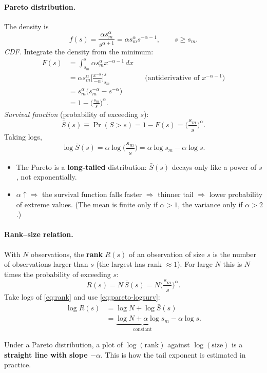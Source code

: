 \paragraph{Pareto distribution.} The density is
\begin{equation}\label{eq:pareto-pdf}
  f(s)=\frac{\alpha s_m^\alpha}{s^{\alpha+1}}=\alpha s_m^\alpha s^{-\alpha-1},\qquad s\ge s_m.
\end{equation}
\emph{CDF.} Integrate the density from the minimum:
\begin{align*}
  F(s)&=\int_{s_m}^{s}\alpha s_m^\alpha x^{-\alpha-1}\,dx\\
  &=\alpha s_m^\alpha\Big[\frac{x^{-\alpha}}{-\alpha}\Big]_{s_m}^{s} &&\text{(antiderivative of }x^{-\alpha-1}\text{)}\\
  &=s_m^\alpha\big(s_m^{-\alpha}-s^{-\alpha}\big)\\
  &=1-\Big(\frac{s_m}{s}\Big)^\alpha.
\end{align*}
\emph{Survival function} (probability of exceeding $s$):
\begin{equation}\label{eq:pareto-surv}
  \bar S(s)\equiv\Pr(S>s)=1-F(s)=\Big(\frac{s_m}{s}\Big)^\alpha .
\end{equation}
Taking logs,
\begin{equation}\label{eq:pareto-logsurv}
  \log\bar S(s)=\alpha\log\Big(\frac{s_m}{s}\Big)=\alpha\log s_m-\alpha\log s .
\end{equation}
\begin{itemize}
  \item The Pareto is a \textbf{long-tailed} distribution: $\bar S(s)$ decays only like a power of $s$, not exponentially.
  \item $\alpha\uparrow\Rightarrow$ the survival function falls faster $\Rightarrow$ thinner tail $\Rightarrow$ lower probability of extreme values. (The mean is finite only if $\alpha>1$, the variance only if $\alpha>2$.)
\end{itemize}

\paragraph{Rank--size relation.}
With $N$ observations, the \textbf{rank} $R(s)$ of an observation of size $s$ is the number of observations larger than $s$ (the largest has rank $\approx1$). For large $N$ this is $N$ times the probability of exceeding $s$:
\begin{equation}\label{eq:rank}
  R(s)=N\,\bar S(s)=N\Big(\frac{s_m}{s}\Big)^\alpha .
\end{equation}
Take logs of \eqref{eq:rank} and use \eqref{eq:pareto-logsurv}:
\begin{align*}
  \log R(s)&=\log N+\log\bar S(s)\\
  &=\underbrace{\log N+\alpha\log s_m}_{\text{constant}}-\alpha\log s .
\end{align*}
\begin{keybox}[title=Log rank vs.\ log size]
Under a Pareto distribution, a plot of $\log(\text{rank})$ against $\log(\text{size})$ is a \textbf{straight line with slope $-\alpha$}. This is how the tail exponent is estimated in practice.
\end{keybox}

